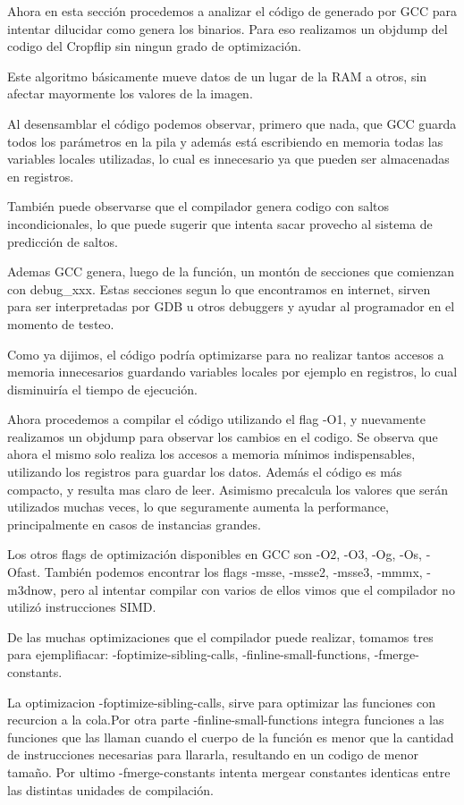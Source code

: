 \documentclass[a4paper]{article}
\begin{document}
Ahora en esta sección procedemos a analizar el código de generado por GCC para intentar dilucidar como genera los binarios. Para eso realizamos un objdump del codigo del Cropflip sin ningun grado de optimización.

Este algoritmo básicamente mueve datos de un lugar de la RAM a otros, sin afectar mayormente los valores de la imagen.

Al desensamblar el código podemos observar, primero que nada, que GCC guarda todos los parámetros en la pila y además está escribiendo en memoria todas las variables locales utilizadas, lo cual es innecesario ya que pueden ser almacenadas en registros.

También puede observarse que el compilador genera codigo con saltos incondicionales, lo que puede sugerir que intenta sacar provecho al sistema de predicción de saltos.

Ademas GCC genera, luego de la función, un montón de secciones que comienzan con debug_xxx. Estas secciones segun lo que encontramos en internet, sirven para ser interpretadas por GDB u otros debuggers y ayudar al programador en el momento de testeo.

Como ya dijimos, el código podría optimizarse para no realizar tantos accesos a memoria innecesarios guardando variables locales por ejemplo en registros, lo cual disminuiría el tiempo de ejecución.

Ahora procedemos a compilar el código utilizando el flag -O1, y nuevamente realizamos un objdump para observar los cambios en el codigo. Se observa que ahora el mismo solo realiza los accesos a memoria mínimos indispensables, utilizando los registros para guardar los datos. Además el código es más compacto, y resulta mas claro de leer. Asimismo precalcula los valores que serán utilizados muchas veces, lo que seguramente aumenta la performance, principalmente en casos de instancias grandes.

Los otros flags de optimización disponibles en GCC son -O2, -O3, -Og, -Os, -Ofast. También podemos encontrar los flags -msse, -msse2, -msse3, -mmmx, -m3dnow, pero al intentar compilar con varios de ellos vimos que el compilador no utilizó instrucciones SIMD.

De las muchas optimizaciones que el compilador puede realizar, tomamos tres para ejemplifiacar: -foptimize-sibling-calls, -finline-small-functions, -fmerge-constants.

La optimizacion -foptimize-sibling-calls, sirve para optimizar las funciones con recurcion a la cola.Por otra parte -finline-small-functions integra funciones a las funciones que las llaman cuando el cuerpo de la función es menor que la cantidad de instrucciones necesarias para llararla, resultando en un codigo de menor tamaño. Por ultimo -fmerge-constants intenta mergear constantes identicas entre las distintas unidades de compilación.
\end{document}
